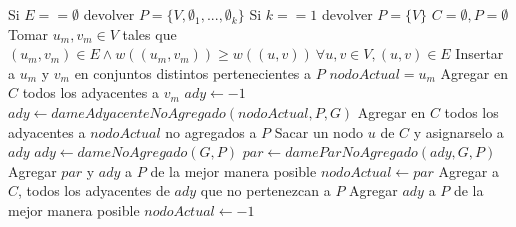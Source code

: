 \documentclass[a4paper]{article}
\begin{document}
\begin{algorithmic}[1]
	\State Si $E == \emptyset$ devolver $P = \{V, \emptyset_1, ..., \emptyset_k \}$
	\State Si $k == 1$ devolver $P = \{V\} $
	\newline
	\State $C = \emptyset, P = \emptyset$
	\State Tomar $u_m, v_m \in V$ tales que $(u_m, v_m) \in E \wedge w((u_m, v_m)) \geq w((u, v)) \ \forall u, v \in V, (u, v) \in E$
	\State Insertar a $u_m$ y $v_m$ en conjuntos distintos pertenecientes a $P$
	\State $nodoActual = u_m$
	\State Agregar en $C$ todos los adyacentes a $v_m$
	\newline
		\State $ady \gets -1$
			\State $ady \gets dameAdyacenteNoAgregado(nodoActual, P, G)$
			\State Agregar en $C$ todos los adyacentes a $nodoActual$ no agregados a $P$
		\Else
				\State Sacar un nodo $u$ de $C$ y asignarselo a $ady$
			\EndWhile
				\State $ady \gets dameNoAgregado(G, P)$
			\EndIf
		\EndIf
		\newline
				\State $par \gets dameParNoAgregado(ady, G, P)$
				\State Agregar $par$ y $ady$ a $P$ de la mejor manera posible
				\State $nodoActual \gets par$
				\State Agregar a $C$, todos los adyacentes de $ady$ que no pertenezcan a $P$
			\Else
				\State Agregar $ady$ a $P$ de la mejor manera posible
				\State $nodoActual \gets -1$
			\EndIf
	\EndWhile
\EndProcedure
\end{algorithmic}
\vspace{0.4cm}
\end{document}
